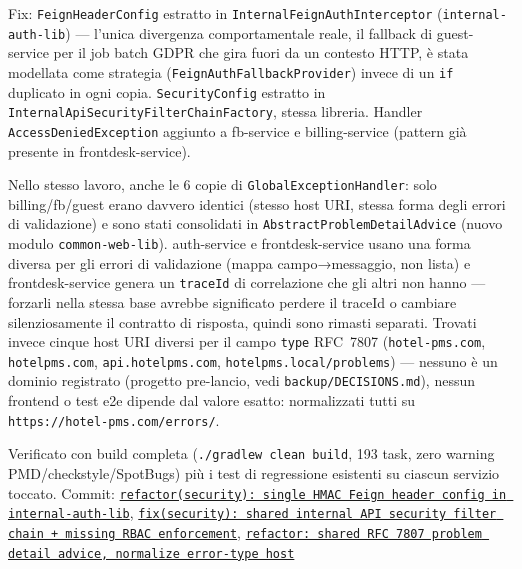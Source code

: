 ﻿\documentclass[a4paper,12pt]{report}
\newcommand{\commitref}[2]{\texttt{\small \href{https://github.com/diegoandruccioli/hotel-pms/commit/#1}{#2}}}
\begin{document}
Fix: \texttt{FeignHeaderConfig} estratto in
\texttt{InternalFeignAuthInterceptor} (\texttt{internal-auth-lib}) --- l'unica
divergenza comportamentale reale, il fallback di guest-service per il job
batch GDPR che gira fuori da un contesto HTTP, è stata modellata come
strategia (\texttt{FeignAuthFallbackProvider}) invece di un \texttt{if}
duplicato in ogni copia. \texttt{SecurityConfig} estratto in
\texttt{InternalApiSecurityFilterChainFactory}, stessa libreria. Handler
\texttt{AccessDeniedException} aggiunto a fb-service e billing-service
(pattern già presente in frontdesk-service).

Nello stesso lavoro, anche le 6 copie di \texttt{GlobalExceptionHandler}: solo
billing/fb/guest erano davvero identici (stesso host URI, stessa forma degli
errori di validazione) e sono stati consolidati in
\texttt{AbstractProblemDetailAdvice} (nuovo modulo \texttt{common-web-lib}).
auth-service e frontdesk-service usano una forma diversa per gli errori di
validazione (mappa campo→messaggio, non lista) e frontdesk-service genera un
\texttt{traceId} di correlazione che gli altri non hanno --- forzarli nella
stessa base avrebbe significato perdere il traceId o cambiare silenziosamente
il contratto di risposta, quindi sono rimasti separati. Trovati invece cinque
host URI diversi per il campo \texttt{type} RFC~7807
(\texttt{hotel-pms.com}, \texttt{hotelpms.com}, \texttt{api.hotelpms.com},
\texttt{hotelpms.local/problems}) --- nessuno è un dominio registrato
(progetto pre-lancio, vedi \texttt{backup/DECISIONS.md}), nessun frontend o
test e2e dipende dal valore esatto: normalizzati tutti su
\texttt{https://hotel-pms.com/errors/}.

Verificato con build completa (\texttt{./gradlew clean build}, 193 task, zero
warning PMD/checkstyle/SpotBugs) più i test di regressione esistenti su
ciascun servizio toccato.
Commit: \commitref{79cd3b1}{refactor(security): single HMAC Feign header config in internal-auth-lib}, \commitref{bdce1e5}{fix(security): shared internal API security filter chain + missing RBAC enforcement}, \commitref{54575ec}{refactor: shared RFC 7807 problem detail advice, normalize error-type host}
\end{document}
